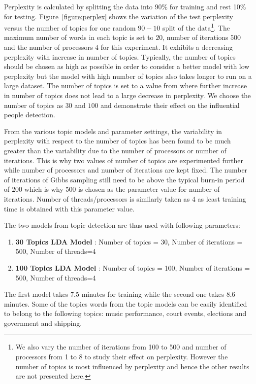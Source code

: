 \documentclass[10pt,journal,compsoc]{IEEEtran}
\begin{document}
Perplexity is calculated by splitting the data into 90\% for training and rest 10\% for testing. 
Figure~\ref{figure:perplex} shows the variation of the test perplexity versus the number of topics for one random $90-10$ split of the data\footnote{We also vary the number of iterations from 100 to 500 and number of processors from 1 to 8 to study their effect on perplexity. However the number of topics is most influenced by perplexity and hence the other results are not presented here.}. The maximum number of words in each topic is set to $20$, number of iterations $500$ and the number of processors $4$ for this experiment. It exhibits a decreasing perplexity with increase in number of topics. Typically, the number of topics should be chosen as high as possible in order to consider a better model with low perplexity but the model with high number of topics also takes longer to run on a large dataset. The number of topics is set to a value from where further increase in number of topics does not lead to a large decrease in perplexity. We choose the number of topics as $30$ and $100$ and demonstrate their effect on the influential people detection.

From the various topic models and parameter settings, the variability in perplexity with respect to the number of topics has been found to be much greater than the variability due to the number of processors or number of iterations. This is why two values of number of topics are experimented further while number of processors and number of iterations are kept fixed. The number of iterations of Gibbs sampling still need to be above the typical burn-in period of $200$ which is why $500$ is chosen as the parameter value for number of iterations. Number of threads/processors is similarly taken as 4 as least training time is obtained with this parameter value. 

The two models from topic detection are thus used with following parameters:
\begin{enumerate}
 \item \textbf{30 Topics LDA Model} : Number of topics = 30, Number of iterations = 500, Number of threads=4
 \item \textbf{100 Topics LDA Model} : Number of topics = 100, Number of iterations = 500, Number of threads=4
\end{enumerate}
The first model takes 7.5 minutes for training while the second one takes 8.6 minutes.
Some of the topics words from the topic models can be easily identified to belong to the following topics: music performance, court events, elections and government and shipping.
\end{document}

